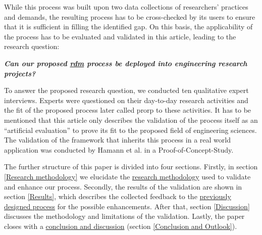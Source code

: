 \documentclass{bausteinefdm}
\begin{document}
While this process was built upon two data collections of researchers' practices and demands, the resulting process has to be cross-checked by its users to ensure that it is sufficient in filling the identified gap.
On this basis, the applicability of the process has to be evaluated and validated in this article, leading to the research question:

\hfill\begin{minipage}{\dimexpr\textwidth-0.5cm}
    \textit{
    \textbf{Can our proposed \hyperref[Glossary:research data management level]{\ac{rdm}} process be deployed into engineering research projects?}}
\end{minipage}

To answer the proposed research question, we conducted ten qualitative expert interviews.
Experts were questioned on their day-to-day research activities and the fit of the proposed process \textendash{} later called \ac{prorp} \textendash{} to these activities. 
It has to be mentioned that this article only describes the validation of the process itself as an \enquote{artificial evaluation} \cite{Venable.2006} to prove its fit to the proposed field of engineering sciences.
The validation of the framework that inherits this process in a real world application was conducted by Hamann et al. \cite{Hamann.2025b} in a Proof-of-Concept-Study.

The further structure of this paper is divided into four sections.
Firstly, in section \ref{Research methodology} we 
elucidate the \hyperref[Research methodology]{research methodology} used to validate and enhance our process.
Secondly, the results of the validation are shown in section \ref{Results}, which describes the collected feedback to the \hyperref[PreviousProcess]{previously designed process} for the possible enhancements.
After that, section \ref{Discussion} discusses the methodology and limitations of the validation.
Lastly, the paper closes with a \hyperref[Discussion]{conclusion and discussion} (section \ref{Conclusion and Outlook}).

\end{document}
